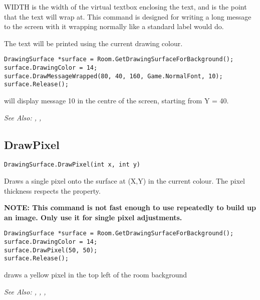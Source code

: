 WIDTH is the width of the virtual textbox enclosing the text, and is the point that
the text will wrap at. This command is designed for writing a long message to the
screen with it wrapping normally like a standard label would do.

The text will be printed using the current drawing colour.

\begin{verbatim}
DrawingSurface *surface = Room.GetDrawingSurfaceForBackground();
surface.DrawingColor = 14;
surface.DrawMessageWrapped(80, 40, 160, Game.NormalFont, 10);
surface.Release();
\end{verbatim}
will display message 10 in the centre of the screen, starting from Y = 40.

\it{See Also:} ,
,


\subsection{DrawPixel}\label{DrawingSurface.DrawPixel}%

\begin{verbatim}
DrawingSurface.DrawPixel(int x, int y)
\end{verbatim}
Draws a single pixel onto the surface at (X,Y) in the current colour. The pixel
thickness respects the 
property.

\bf{NOTE:} This command is not fast enough to use repeatedly to build up an image. Only
use it for single pixel adjustments.

\begin{verbatim}
DrawingSurface *surface = Room.GetDrawingSurfaceForBackground();
surface.DrawingColor = 14;
surface.DrawPixel(50, 50);
surface.Release();
\end{verbatim}
draws a yellow pixel in the top left of the room background

\it{See Also:} ,
,
,


